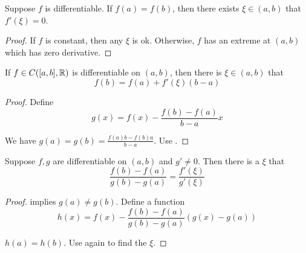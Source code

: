 \begin{theorem}\label{rolle_theorem}
    Suppose $f$ is differentiable. If $f(a) = f(b)$, then there exists $\xi \in (a,b)$ that $f'(\xi) = 0$.
\end{theorem}
\begin{proof}
    If $f$ is constant, then any $\xi$ is ok. Otherwise, $f$ has an extreme at $(a,b)$ which has zero derivative.
\end{proof}

\begin{theorem}
    If $f \in C([a,b], \mathbb{R})$ is differentiable on $(a,b)$, then there is $\xi \in (a,b)$ that
    \begin{equation}
        f(b) = f(a) + f'(\xi)(b-a)
    \end{equation}
\end{theorem}
\begin{proof}
    Define 
    \begin{equation}
        g(x) = f(x) - \frac{f(b) - f(a)}{b-a}x
    \end{equation}
    
    We have $g(a) = g(b) = \frac{f(a)b - f(b) a}{b-a}$. Use .
\end{proof}


\begin{theorem}
    Suppose $f,g$ are differentiable on $(a,b)$ and $g' \neq 0$. Then there is a $\xi$ that
    \begin{equation}
        \frac{f(b) - f(a)}{g(b) - g(a)} = \frac{f'(\xi)}{g'(\xi)}
    \end{equation}
\end{theorem}
\begin{proof}
     implies $g(a) \neq g(b)$. Define a function 
    \begin{equation}
        h(x) = f(x) - \frac{f(b) - f(a)}{g(b) - g(a)}(g(x) - g(a))
    \end{equation}
    
    $h(a) = h(b)$. Use  again to find the $\xi$.
\end{proof}

